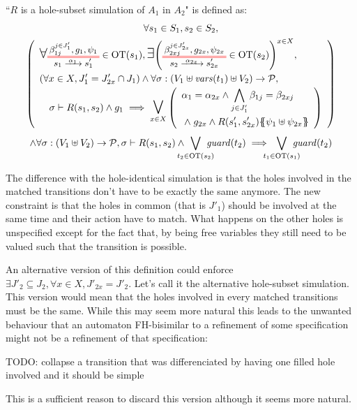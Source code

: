 \documentclass{article}
\begin{document}
\begin{defi}
``\(R\) is a hole-subset simulation of \(A_1\) in \(A_2\)" is defined as:
\begin{multline*}
	\forall s_1 \in S_1, s_2 \in S_2, \\
	\mpar{\renewcommand\arraystretch{1.4}\everymath{\displaystyle}\begin{array}{l}
		\bigsymb{\forall} \OTx{1}{}{1}{1} \in \fOT{s_1}, \bigsymb{\exists} \mpar{\OTx{2}{x}{2x}{2x} \in \fOT{s_2}}^{x \in X}, \\
		\mpar{\forall x \in X, J'_1 = J'_{2x} \cap J_1} \wedge \forall \sigma: \mpar{V_1 \uplus \fvars{t_1} \uplus V_2} \to \values, \\
		\quad \sigma \vdash R\mpar{s_1, s_2} \wedge g_1 \implies \operatorname*{\bigsymb{\bigvee}}_{x \in X} \mpar{\begin{array}{l}
			\alpha_1 = \alpha_{2x} \wedge \bigwedge_{j \in J'_1} \beta_{1j} = \beta_{2xj} \\
			\nwedge g_{2x} \wedge R\mpar{s'_1, s'_{2x}}\psubst{\psi_1 \uplus \psi_{2x}}
		\end{array}} \\
	\end{array}} \\
	\wedge \forall \sigma: \mpar{V_1 \uplus V_2} \to \values, \sigma \vdash R\mpar{s_1, s_2} \wedge \bigvee_\subbox{t_2 \in \fOT{s_2}} \fguard{t_2} \implies \bigvee_\subbox{t_1 \in \fOT{s_1}} \fguard{t_2}
\end{multline*}
\end{defi}
The difference with the hole-identical simulation is that the holes involved in the matched transitions don't have to be exactly the same anymore.
The new constraint is that the holes in common (that is \(J'_1\)) should be involved at the same time and their action have to match.
What happens on the other holes is unspecified except for the fact that, by being free variables they still need to be valued such that the transition is possible.

\begin{exi} %
\end{exi}

An alternative version of this definition could enforce \(\exists J'_2 \subseteq J_2, \forall x \in X, J'_{2x} = J'_2\).
Let's call it the alternative hole-subset simulation.
This version would mean that the holes involved in every matched transitions must be the same.
While this may seem more natural this leads to the unwanted behaviour that an automaton FH-bisimilar to a refinement of some specification might not be a refinement of that specification:
\begin{prop}
TODO: collapse a transition that was differenciated by having one filled hole involved and it should be simple
\end{prop}
This is a sufficient reason to discard this version although it seems more natural.
\begin{prop}
\end{prop}
\end{document}
